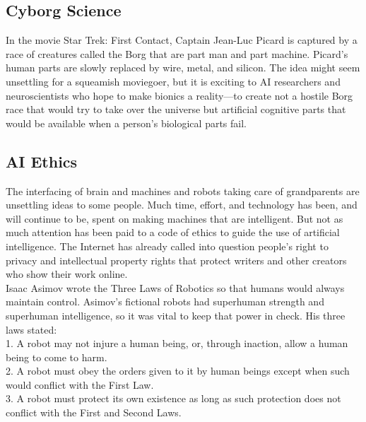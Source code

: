 \documentclass[12pt]{article}
\begin{document}
  \subsection{Cyborg Science}
  \large
   In the movie Star Trek: First Contact, Captain Jean-Luc Picard is captured by a race of creatures called the Borg that are part man and part machine. Picard’s human parts are slowly replaced by wire, metal, and silicon. The idea might seem unsettling for a squeamish moviegoer, but it is exciting to AI researchers and neuroscientists who hope to make bionics a reality—to create not a hostile Borg race that would try to take over the universe but artificial cognitive parts that would be available when a person’s biological parts fail.\\
   \huge
   \subsection{AI Ethics}
   \large
  The interfacing of brain and machines and robots taking care of grandparents are unsettling ideas to some people. Much time, effort, and technology has been, and will continue to be, spent on making machines that are intelligent. But not as much attention has been paid to a code of ethics to guide the use of artificial intelligence. The Internet has already called into question people’s right to privacy and intellectual property rights that protect writers and other creators who show their work online.\\
  Isaac Asimov wrote the Three Laws of Robotics so that humans would always maintain control. Asimov’s fictional robots had superhuman strength and superhuman intelligence, so it was vital to keep that power in check. His three laws stated:\\  1. A robot may not injure a human being, or, through inaction, allow a human being to come to harm.\\
   2. A robot must obey the orders given to it by human beings except when such would conflict with the First Law.\\ 
   3. A robot must protect its own existence as long as such protection does not conflict with the First and Second Laws.\\
   \huge
\end{document}
